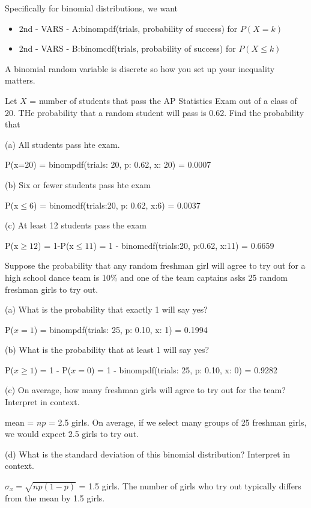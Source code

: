 \documentclass[../stats.tex]{subfiles}
\begin{document}
Specifically for binomial distributions, we want
\begin{itemize}
    \item 2nd - VARS - A:binompdf(trials, probability of success) for $P(X=k)$
    \item 2nd - VARS - B:binomcdf(trials, probability of success) for $P(X\leq k)$
\end{itemize}
A binomial random variable is discrete so how you set up your inequality matters.

\begin{example}
    Let $X$ = number of students that pass the AP Statistics Exam out of a class of 20. THe probability that a random student will pass is 0.62. Find the probability that 

    (a) All students pass hte exam.

    P(x=20) = binompdf(trials: 20, p: 0.62, x: 20) = 0.0007

    (b) Six or fewer students pass hte exam 

    P(x$\leq 6$) = binomcdf(trials:20, p: 0.62, x:6) = 0.0037

    (c) At least 12 students pass the exam 

    P(x$\geq 12$) = 1-P(x$\leq 11$) = 1 - binomcdf(trials:20, p:0.62, x:11) = 0.6659
\end{example}

\begin{example}
    Suppose the probability that any random freshman girl will agree to try out for a high school dance team is 10\% and one of the team captains asks 25 random freshman girls to try out.

    (a) What is the probability that exactly 1 will say yes?

    P($x=1$) = binompdf(trials: 25, p: 0.10, x: 1) = 0.1994

    (b) What is the probability that at least 1 will say yes?

    P($x\geq 1$) = 1 - P($x=0$) = 1 - binompdf(trials: 25, p: 0.10, x: 0) = 0.9282

    (c) On average, how many freshman girls will agree to try out for the team? Interpret in context.

    mean = $np$ = 2.5 girls. On average, if we select many groups of 25 freshman girls, we would expect 2.5 girls to try out.

    (d) What is the standard deviation of this binomial distribution? Interpret in context.

    $\sigma_x = \sqrt{np(1-p)}$ = 1.5 girls. The number of girls who try out typically differs from the mean by 1.5 girls.
\end{example}
\pagebreak
\end{document}
